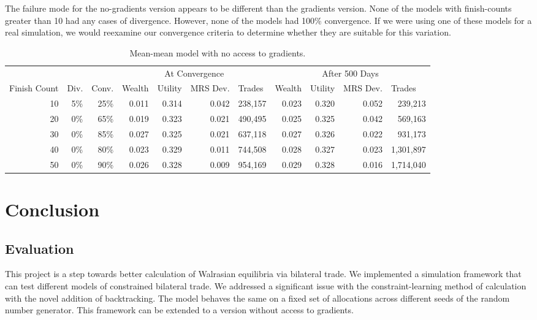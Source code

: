 \documentclass[12pt,a4paper,titlepage]{article}
\begin{document}
The failure mode for the no-gradients version appears to be different than the gradients version.
None of the models with finish-counts greater than 10 had any cases of divergence.
However, none of the models had 100\% convergence.
If we were using one of these models for a real simulation, we would reexamine our convergence criteria to determine whether they are suitable for this variation.

\begin{table}
  \begin{tabular}{r|rr|rrrr|rrrr}
    
    & \multicolumn{1}{|l}{} & \multicolumn{1}{l}{} & \multicolumn{ 4}{|c|}{At Convergence} & \multicolumn{ 4}{c}{After 500 Days} \\ 
    Finish Count & \multicolumn{1}{|l}{Div.} & \multicolumn{1}{l}{Conv.} & \multicolumn{1}{|l}{Wealth} & \multicolumn{1}{l}{Utility} & \multicolumn{1}{l}{MRS Dev.} & \multicolumn{1}{l}{Trades} & \multicolumn{1}{|l}{Wealth} & \multicolumn{1}{l}{Utility} & \multicolumn{1}{l}{MRS Dev.} & \multicolumn{1}{l}{Trades} \\ 
    \hline
    10 & 5\% & 25\% & 0.011 & 0.314 & 0.042 & 238,157 & 0.023 & 0.320 & 0.052 & 239,213 \\ 
    20 & 0\% & 65\% & 0.019 & 0.323 & 0.021 & 490,495 & 0.025 & 0.325 & 0.042 & 569,163 \\ 
    30 & 0\% & 85\% & 0.027 & 0.325 & 0.021 & 637,118 & 0.027 & 0.326 & 0.022 & 931,173 \\ 
    40 & 0\% & 80\% & 0.023 & 0.329 & 0.011 & 744,508 & 0.028 & 0.327 & 0.023 & 1,301,897 \\ 
    50 & 0\% & 90\% & 0.026 & 0.328 & 0.009 & 954,169 & 0.029 & 0.328 & 0.016 & 1,714,040 \\ 
  \end{tabular}
  \caption{Mean-mean model with no access to gradients.}
  \label{tab:ut}
\end{table}

\section{Conclusion}\label{conclusion}

\subsection{Evaluation}
This project is a step towards better calculation of Walrasian equilibria via bilateral trade.
We implemented a simulation framework that can test different models of constrained bilateral trade.
We addressed a significant issue with the constraint-learning method of calculation with the novel addition of backtracking.
The model behaves the same on a fixed set of allocations across different seeds of the random number generator.
This framework can be extended to a version without access to gradients.
\end{document}
